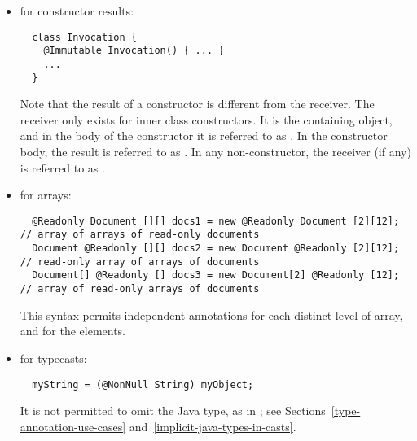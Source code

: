 \documentclass[10pt]{article}
\begin{document}
\begin{itemize}


\item for constructor results:

\preverbnegspace
\begin{Verbatim}
  class Invocation {
    @Immutable Invocation() { ... }
    ...
  }
\end{Verbatim}
\preverbnegspace

Note that the result of a constructor is different from the receiver.  The
receiver only exists for inner class constructors.  It is the containing
object, and in the body of the constructor it is referred to as
.  In the constructor body, the result is referred to as
.  In any non-constructor, the receiver (if any) is referred to
as .


\item for arrays:
\preverbnegspace
\begin{Verbatim}
  @Readonly Document [][] docs1 = new @Readonly Document [2][12]; // array of arrays of read-only documents
  Document @Readonly [][] docs2 = new Document @Readonly [2][12]; // read-only array of arrays of documents
  Document[] @Readonly [] docs3 = new Document[2] @Readonly [12]; // array of read-only arrays of documents
\end{Verbatim}

\preverbnegspace
This syntax permits independent annotations for each distinct level of
array, and for the elements.


\item for typecasts:
\preverbnegspace
\begin{Verbatim}
  myString = (@NonNull String) myObject;
\end{Verbatim}
\preverbnegspace
It is not permitted to omit the Java type, as in
; see
Sections~\ref{type-annotation-use-cases} and~\ref{implicit-java-types-in-casts}.


\end{itemize}
\end{document}
